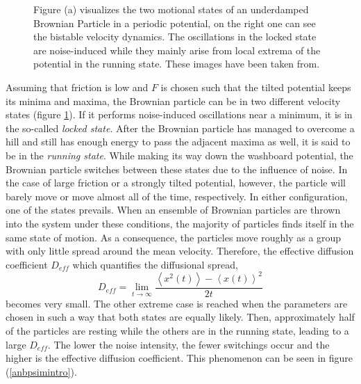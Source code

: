 \documentclass[12pt,a4paper]{article}
\begin{document}
\begin{figure}[H]
	\caption{Figure (a) visualizes the two motional states of an underdamped Brownian Particle in a periodic potential, on the right one can see the bistable velocity dynamics. The oscillations in the locked state are noise-induced while they mainly arise from local extrema of the potential in the running state. These images have been taken from\cite{bpp}.}
	\label{veldynintro} 
\end{figure}
Assuming that friction is low and $F$ is chosen such that the tilted potential keeps its minima and maxima, the Brownian particle can be in two different velocity states (figure \ref{veldynintro}). If it performs noise-induced oscillations near a minimum, it is in the so-called \textit{locked state}.
After the Brownian particle has managed to overcome a hill and still has enough energy to pass the adjacent maxima as well, it is said to be in the \textit{running state}.
While making its way down the washboard potential, the Brownian particle switches between these states due to the influence of noise.
In the case of large friction or a strongly tilted potential, however, the particle will barely move or move almost all of the time, respectively. In either configuration, one of the states prevails. When an ensemble of Brownian particles are thrown into the system under these conditions, the majority of particles finds itself in the same state of motion. As a consequence, the particles move roughly as a group with only little spread around the mean velocity. Therefore, the effective diffusion coefficient $D_{eff}$ which quantifies the diffusional spread,
\begin{equation}
D_{eff}=\lim_{t\rightarrow\infty}\frac{\left\langle x^2(t) \right\rangle-\left\langle x(t)\right\rangle ^2}{2t}
\end{equation}
becomes very small. The other extreme case is reached when the parameters are chosen in such a way that both states are equally likely. Then, approximately half of the particles are resting while the others are in the running state, leading to a large $D_{eff}$. The lower the noise intensity, the fewer switchings occur and the higher is the effective diffusion coefficient. This phenomenon can be seen in figure (\ref{anbpsimintro}).
\end{document}
